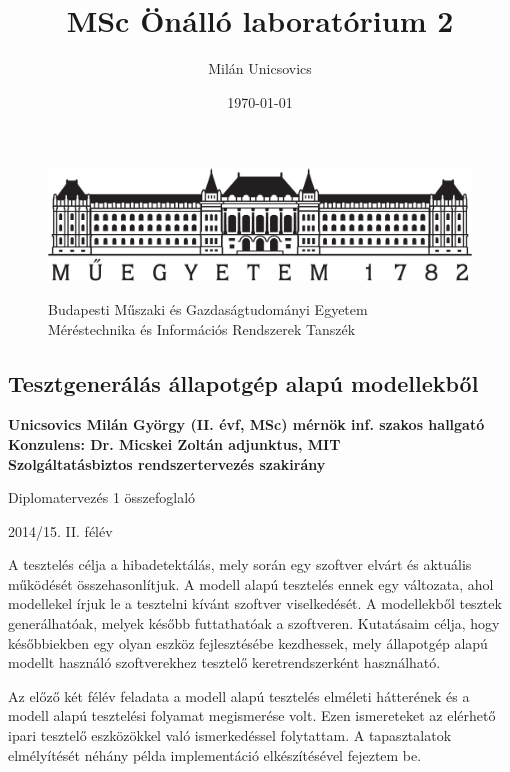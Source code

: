 \documentclass{article}
\author{Milán Unicsovics}
\title{MSc Önálló laboratórium 2}
\date{\today}
\begin{document}
\thispagestyle{empty}
\begin{figure}[htp]
\centering
\includegraphics[scale=0.3]{figures/bme_logo.pdf}
\begin{center}
Budapesti Műszaki és Gazdaságtudományi Egyetem\\
Méréstechnika és Információs Rendszerek Tanszék
\end{center}
\end{figure}
\vspace*{-0.1in}
\begin{center}
\subsection*{Tesztgenerálás állapotgép alapú modellekből}
{\bf
Unicsovics Milán György (II. évf, MSc) mérnök inf. szakos hallgató\\[0.3cm]

Konzulens: Dr. Micskei Zoltán adjunktus, MIT\\[0.3cm]

Szolgáltatásbiztos rendszertervezés szakirány

Diplomatervezés 1 összefoglaló

2014/15. II. félév
}
\end{center}
\vspace{0.5cm}

A tesztelés célja a hibadetektálás, mely során egy szoftver elvárt és aktuális működését összehasonlítjuk. A modell alapú tesztelés ennek egy változata, ahol modellekel írjuk le a tesztelni kívánt szoftver viselkedését. A modellekből tesztek generálhatóak, melyek később futtathatóak a szoftveren. Kutatásaim célja, hogy későbbiekben egy olyan eszköz fejlesztésébe kezdhessek, mely állapotgép alapú modellt használó szoftverekhez tesztelő keretrendszerként használható.

Az előző két félév feladata a modell alapú tesztelés elméleti hátterének és a modell alapú tesztelési folyamat megismerése volt. Ezen ismereteket az elérhető ipari tesztelő eszközökkel való ismerkedéssel folytattam. A tapasztalatok elmélyítését néhány példa implementáció elkészítésével fejeztem be.
\end{document}
